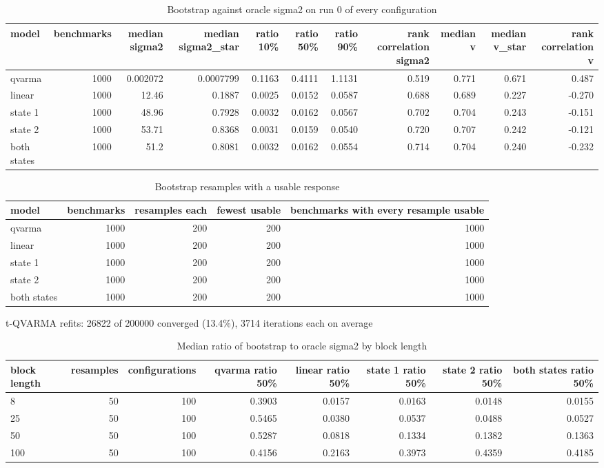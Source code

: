 \begin{table}[htbp]
\centering
\caption{Bootstrap against oracle sigma2 on run 0 of every configuration}
\label{tab:fit_metric_bootstrap}
\begin{tabular}{lrrrrrrrrrr}
\hline
model & benchmarks & median sigma2 & median sigma2\_star & ratio 10\% & ratio 50\% & ratio 90\% & rank correlation sigma2 & median v & median v\_star & rank correlation v \\
\hline
qvarma & 1000 & 0.002072 & 0.0007799 & 0.1163 & 0.4111 & 1.1131 & 0.519 & 0.771 & 0.671 & 0.487 \\
linear & 1000 & 12.46 & 0.1887 & 0.0025 & 0.0152 & 0.0587 & 0.688 & 0.689 & 0.227 & -0.270 \\
state 1 & 1000 & 48.96 & 0.7928 & 0.0032 & 0.0162 & 0.0567 & 0.702 & 0.704 & 0.243 & -0.151 \\
state 2 & 1000 & 53.71 & 0.8368 & 0.0031 & 0.0159 & 0.0540 & 0.720 & 0.707 & 0.242 & -0.121 \\
both states & 1000 & 51.2 & 0.8081 & 0.0032 & 0.0162 & 0.0554 & 0.714 & 0.704 & 0.240 & -0.232 \\
\hline
\end{tabular}
\end{table}

\begin{table}[htbp]
\centering
\caption{Bootstrap resamples with a usable response}
\label{tab:fit_metric_resamples}
\begin{tabular}{lrrrr}
\hline
model & benchmarks & resamples each & fewest usable & benchmarks with every resample usable \\
\hline
qvarma & 1000 & 200 & 200 & 1000 \\
linear & 1000 & 200 & 200 & 1000 \\
state 1 & 1000 & 200 & 200 & 1000 \\
state 2 & 1000 & 200 & 200 & 1000 \\
both states & 1000 & 200 & 200 & 1000 \\
\hline
\end{tabular}
\par\smallskip t-QVARMA refits: 26822 of 200000 converged (13.4\%), 3714 iterations each on average
\end{table}

\begin{table}[htbp]
\centering
\caption{Median ratio of bootstrap to oracle sigma2 by block length}
\label{tab:fit_metric_block_length}
\begin{tabular}{lrrrrrrr}
\hline
block length & resamples & configurations & qvarma ratio 50\% & linear ratio 50\% & state 1 ratio 50\% & state 2 ratio 50\% & both states ratio 50\% \\
\hline
8 & 50 & 100 & 0.3903 & 0.0157 & 0.0163 & 0.0148 & 0.0155 \\
25 & 50 & 100 & 0.5465 & 0.0380 & 0.0537 & 0.0488 & 0.0527 \\
50 & 50 & 100 & 0.5287 & 0.0818 & 0.1334 & 0.1382 & 0.1363 \\
100 & 50 & 100 & 0.4156 & 0.2163 & 0.3973 & 0.4359 & 0.4185 \\
\hline
\end{tabular}
\end{table}

